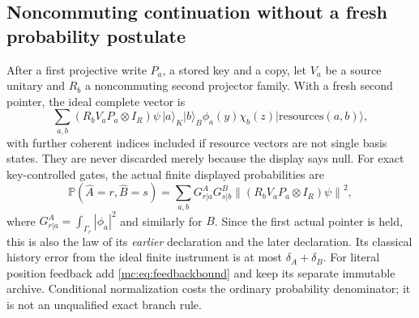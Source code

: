 \documentclass[11pt,oneside,openany]{book}
\theoremstyle{definition}
\theoremstyle{remark}\newtheorem{remark}[theorem]{Remark}
\providecommand{\Prb}{\mathbb P}
\providecommand{\ket}[1]{\lvert#1\rangle}
\providecommand{\norm}[1]{\left\lVert#1\right\rVert}
\begin{document}
\subsection{Noncommuting continuation without a fresh probability postulate}
After a first projective write $P_a$, a stored key and a copy, let $V_a$ be a source unitary and $R_b$ a noncommuting second projector family. With a fresh second pointer, the ideal complete vector is
\begin{equation}\label{mc:eq:jointwave}
 \sum_{a,b}(R_bV_aP_a\otimes I_R)\psi\,
         \ket a_K\ket b_B\phi_a(y)\chi_b(z)
         \ket{\mathrm{resources}(a,b)},
\end{equation}
with further coherent indices included if resource vectors are not single basis states. They are never discarded merely because the display says null. For exact key-controlled gates, the actual finite displayed probabilities are
\begin{equation}\label{mc:eq:noisymarks}
 \Prb(\widehat A=r,\widehat B=s)
 =\sum_{a,b}G^A_{r|a}G^B_{s|b}
                      \norm{(R_bV_aP_a\otimes I_R)\psi}^2,
\end{equation}
where $G^A_{r|a}=\int_{\Gamma_r}|\phi_a|^2$ and similarly for $B$. Since the first actual pointer is held, this is also the law of its \emph{earlier} declaration and the later declaration. Its classical history error from the ideal finite instrument is at most $\delta_A+\delta_B$. For literal position feedback add \eqref{mc:eq:feedbackbound} and keep its separate immutable archive. Conditional normalization costs the ordinary probability denominator; it is not an unqualified exact branch rule.
\end{document}
